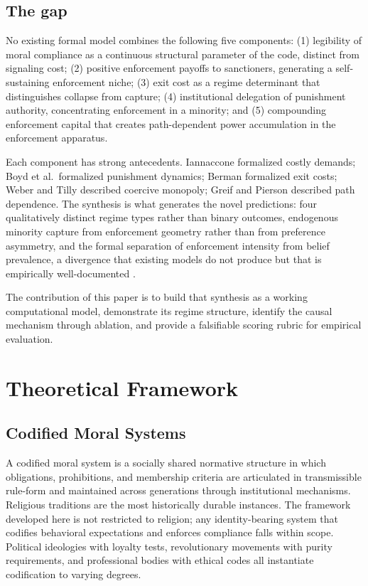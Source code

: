 \documentclass[12pt]{article}
\begin{document}
\subsection{The gap}

No existing formal model combines the following five components: (1) legibility of moral compliance as a continuous structural parameter of the code, distinct from signaling cost; (2) positive enforcement payoffs to sanctioners, generating a self-sustaining enforcement niche; (3) exit cost as a regime determinant that distinguishes collapse from capture; (4) institutional delegation of punishment authority, concentrating enforcement in a minority; and (5) compounding enforcement capital that creates path-dependent power accumulation in the enforcement apparatus.

Each component has strong antecedents. Iannaccone formalized costly demands; Boyd et al.\ formalized punishment dynamics; Berman formalized exit costs; Weber \cite{weber1946} and Tilly \cite{tilly1985} described coercive monopoly; Greif and Pierson described path dependence. The synthesis is what generates the novel predictions: four qualitatively distinct regime types rather than binary outcomes, endogenous minority capture from enforcement geometry rather than from preference asymmetry, and the formal separation of enforcement intensity from belief prevalence, a divergence that existing models do not produce but that is empirically well-documented \cite{cohen2001,ulmer2008,wedeen1999}.

The contribution of this paper is to build that synthesis as a working computational model, demonstrate its regime structure, identify the causal mechanism through ablation, and provide a falsifiable scoring rubric for empirical evaluation.



\section{Theoretical Framework}

\subsection{Codified Moral Systems}

A codified moral system is a socially shared normative structure in which obligations, prohibitions, and membership criteria are articulated in transmissible rule-form and maintained across generations through institutional mechanisms. Religious traditions are the most historically durable instances. The framework developed here is not restricted to religion; any identity-bearing system that codifies behavioral expectations and enforces compliance falls within scope. Political ideologies with loyalty tests, revolutionary movements with purity requirements, and professional bodies with ethical codes all instantiate codification to varying degrees.
\end{document}
